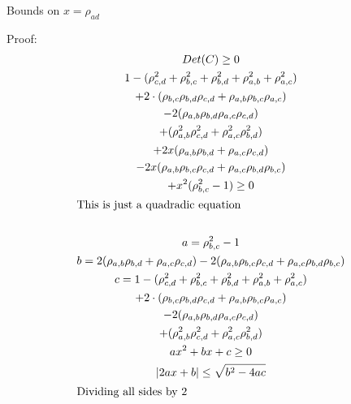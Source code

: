 \documentclass[a4paper]{article}
\begin{document}
\begin{theorem} \label{four} 
Bounds on $x=\rho_{ad}$
\\
\boxed{
\begin{gathered}
|\mathbf{\rho_{ad}} - \frac{(\rho_{a,b} \cdot \rho_{b,d} + \rho_{a,c} \cdot \rho_{c,d}) - \rho_{b,c} \cdot (\rho_{a,b} \cdot \rho_{c,d} + \rho_{a,c} \cdot \rho_{b,d}) }{1 - \rho_{b,c}^2} | \leq (1 - \rho_{b,c}^2) \sqrt{D}
\\
D = (1 - \rho_{a,b}^2 - \rho_{a,c}^2 -\rho_{b,c}^2 + 2 \cdot \rho_{a,b} \cdot \rho_{a,c} \cdot \rho_{b,c}) \cdot (1 - \rho_{b,c}^2 - \rho_{b,d}^2- \rho_{c,d}^2+ 2 \cdot \rho_{b,c} \cdot \rho_{b,d} \cdot \rho_{c,d})
\end{gathered}
}
   
Proof:
\begin{gather*}
Det(C) \geq 0 
\\
1 - (\rho_{c,d}^2 + \rho_{b,c}^2 + \rho_{b,d}^2 + \rho_{a,b}^2 + \rho_{a,c}^2) 
\\
+ 2 \cdot (\rho_{b,c} \rho_{b,d} \rho_{c,d} 
+ \rho_{a,b} \rho_{b,c} \rho_{a,c}) 
\\
- 2 ( \rho_{a,b} \rho_{b,d} \rho_{a,c} \rho_{c,d} )
\\
+ (\rho_{a,b}^2 \rho_{c,d}^2 + \rho_{a,c}^2 \rho_{b,d}^2)
\\
+ 2x (\rho_{a,b} \rho_{b,d} + \rho_{a,c} \rho_{c,d})
\\
- 2x ( \rho_{a,b} \rho_{b,c} \rho_{c,d} 
+ \rho_{a,c} \rho_{b,d} \rho_{b,c} )
\\
+ x^2 ( \rho_{b,c}^2 -1) \geq 0
\\
\shortintertext{This is just a quadradic equation}
\\
a = \rho_{b,c}^2 -1 
\\
b = 2( \rho_{a,b} \rho_{b,d} + \rho_{a,c} \rho_{c,d}) - 2 ( \rho_{a,b} \rho_{b,c} \rho_{c,d} 
+ \rho_{a,c} \rho_{b,d} \rho_{b,c} ) 
\\
c = 1 - (\rho_{c,d}^2 + \rho_{b,c}^2 + \rho_{b,d}^2 + \rho_{a,b}^2 + \rho_{a,c}^2) 
\\
+ 2 \cdot (\rho_{b,c} \rho_{b,d} \rho_{c,d} 
+ \rho_{a,b} \rho_{b,c} \rho_{a,c}) 
\\
- 2 ( \rho_{a,b} \rho_{b,d} \rho_{a,c} \rho_{c,d} )
\\
+ (\rho_{a,b}^2 \rho_{c,d}^2 + \rho_{a,c}^2 \rho_{b,d}^2)
\\
ax^2 + bx + c \geq 0
\\
|2ax + b| \leq \sqrt{b^2 - 4ac}
\\
\shortintertext{Dividing all sides by 2}

\end{gather*}
\end{theorem}
\end{document}
